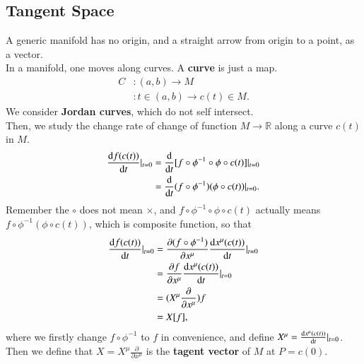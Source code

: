 \documentclass[openany,10pt]{book}
\theoremstyle{definition}
\theoremstyle{definition}
\theoremstyle{remark}
\begin{document}
\subsection{Tangent Space}
A generic manifold has no origin, and a straight arrow from origin to a point, as a vector.\\
In a manifold, one moves along curves. A \textbf{curve} is just a map.
\begin{equation}
    \begin{aligned}
        C&:(a,b)\to M\\
        &:t\in(a,b)\to c(t)\in M.
    \end{aligned}
\end{equation}
We consider \textbf{Jordan curves}, which do not self intersect.\\
Then, we study the change rate of change of function $M\to\mathbb{R}$ along a curve $c(t)$ in $M$. 
\begin{equation}
    \begin{aligned}
        \frac{{\rm{d}}f(c(t))}{{\rm{d}}t}|_{t=0}&=\frac{{\rm{d}}}{{\rm{d}}t}[f\circ\phi^{-1}\circ\phi\circ c(t)]|_{t=0}\\
        &=\frac{{\rm{d}}}{{\rm{d}}t}(f\circ\phi^{-1})(\phi\circ c(t))|_{t=0}.
    \end{aligned}
\end{equation}
Remember the $\circ$ does not mean $\times$, and $f\circ\phi^{-1}\circ\phi\circ c(t)$ actually means $f\circ\phi^{-1}(\phi\circ c(t))$, which is composite function, so that
\begin{equation}
    \begin{aligned}
        \frac{{\rm{d}}f(c(t))}{{\rm{d}}t}|_{t=0}&=\frac{\partial (f\circ\phi^{-1})}{\partial x^\mu}\frac{{\rm{d}}x^\mu(c(t))}{{\rm{d}}t}|_{t=0}\\
        &=\frac{\partial f}{\partial x^\mu}\frac{{\rm{d}}x^\mu(c(t))}{{\rm{d}}t}|_{t=0}\\
        &=(X^\mu\frac{\partial}{\partial x^\mu})f\\
        &=X[f],
    \end{aligned}
\end{equation}
where we firstly change $f\circ\phi^{-1}$ to $f$ in convenience, and define $X^\mu=\frac{{\rm{d}}x^\mu(c(t))}{{\rm{d}}t}|_{t=0}$.\\
Then we define that $X=X^\mu\frac{\partial}{\partial x^\mu}$ is the \textbf{tagent vector} of $M$ at $P=c(0)$. 
\\
\end{document}

